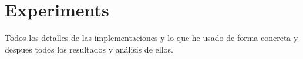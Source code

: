 \chapter{Experiments} \label{sec:experiments}

Todos los detalles de las implementaciones y lo que he usado de forma concreta y despues todos los resultados y análisis de ellos.